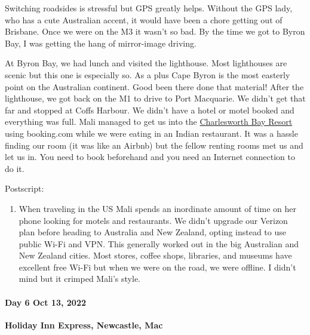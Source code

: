 Switching roadsides is stressful but GPS greatly helps. Without the GPS
lady, who has a cute Australian accent, it would have been a chore
getting out of Brisbane. Once we were on the M3 it wasn't so bad. By the
time we got to Byron Bay, I was getting the hang of mirror-image
driving.

At Byron Bay, we had lunch and visited the lighthouse. Most lighthouses
are scenic but this one is especially so. As a plus Cape Byron is the
most easterly point on the Australian continent. Good been there done
that material! After the lighthouse, we got back on the M1 to drive to
Port Macquarie. We didn't get that far and stopped at Coffs Harbour. We
didn't have a hotel or motel booked and everything was full. Mali
managed to get us into the
\href{https://charlesworthbaybeachresort.com.au/}{Charlesworth Bay
Resort} using booking.com while we were eating in an Indian restaurant.
It was a hassle finding our room (it was like an Airbnb) but the
fellow renting rooms met us and let us in. You need to book beforehand
and you need an Internet connection to do it.

Postscript:

\begin{enumerate}
\def\labelenumi{\arabic{enumi}.}
\item
  When traveling in the US Mali spends an inordinate amount of time on
  her phone looking for motels and restaurants. We didn't upgrade our
  Verizon plan before heading to Australia and New Zealand, opting
  instead to use public Wi-Fi and VPN. This generally worked out in the
  big Australian and New Zealand cities. Most stores, coffee shops,
  libraries, and museums have excellent free Wi-Fi but when we were on
  the road, we were offline. I didn't mind but it crimped Mali's style.
\end{enumerate}

\hypertarget{day-6-oct-13-2022}{%
\paragraph{\texorpdfstring{\textbf{Day 6 Oct 13,
2022}}{Day 6 Oct 13, 2022}}\label{day-6-oct-13-2022}}

\textbf{Holiday Inn Express, Newcastle, Mac}


